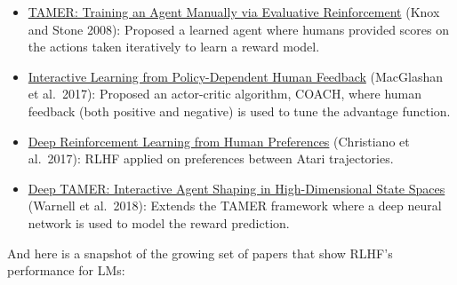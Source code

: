 \documentclass[11pt,a4paper]{article}
\begin{document}
\begin{itemize}
\item
  \href{https://www.cs.utexas.edu/~pstone/Papers/bib2html-links/ICDL08-knox.pdf}{TAMER: Training an Agent Manually via Evaluative Reinforcement} (Knox and Stone 2008): Proposed a learned agent where humans provided scores on the actions taken iteratively to learn a reward model.
\item
  \href{http://proceedings.mlr.press/v70/macglashan17a/macglashan17a.pdf}{Interactive Learning from Policy-Dependent Human Feedback} (MacGlashan et al.~2017): Proposed an actor-critic algorithm, COACH, where human feedback (both positive and negative) is used to tune the advantage function.
\item
  \href{https://proceedings.neurips.cc/paper/2017/hash/d5e2c0adad503c91f91df240d0cd4e49-Abstract.html}{Deep Reinforcement Learning from Human Preferences} (Christiano et al.~2017): RLHF applied on preferences between Atari trajectories.
\item
  \href{https://ojs.aaai.org/index.php/AAAI/article/view/11485}{Deep TAMER: Interactive Agent Shaping in High-Dimensional State Spaces} (Warnell et al.~2018): Extends the TAMER framework where a deep neural network is used to model the reward prediction.
\end{itemize}

And here is a snapshot of the growing set of papers that show RLHF's performance for LMs:
\end{document}
